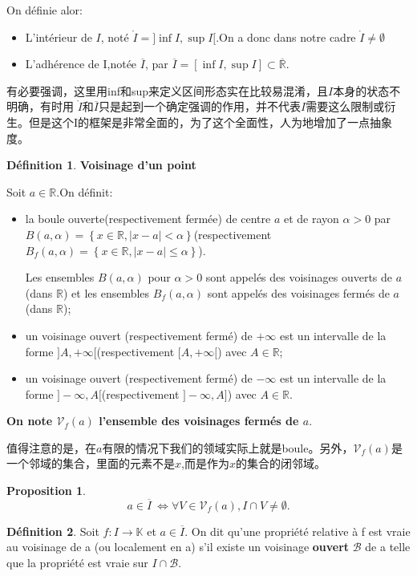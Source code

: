 \documentclass[12pt]{book}
\theoremstyle{definition}\newtheorem{dfn}{Définition}[chapter]
\theoremstyle{plain}\newtheorem{thm}{Théorème}[chapter]
\theoremstyle{plain}\newtheorem{prp}{Proposition}[chapter]
\theoremstyle{plain}\newtheorem{lem}{\bf Lemme}[chapter]
\theoremstyle{plain}\newtheorem{axm}{\bf Axiome}[chapter]
\theoremstyle{plain}\newtheorem{lmm}{\bf Lemme}[chapter]
\theoremstyle{plain}\newtheorem{cor}{\bf Corollaire}[chapter]
\theoremstyle{remark}\newtheorem{rem}{Remarque}[chapter]
\begin{document}
On définie alor:
\begin{itemize}
\item L'intérieur de $I$, noté $\mathring{I}=]\inf I,\sup I[$.On a donc dans notre cadre $\mathring{I}\not = \emptyset$
\item L'adhérence de I,notée $\overline{I}$, par $\overline{I}=[\inf I,\sup I]\subset \overline{\mathbb{R}}.$
\end{itemize}
有必要强调，这里用inf和sup来定义区间形态实在比较易混淆，且$I$本身的状态不明确，有时用 $\mathring{I}$和$\overline{I}$只是起到一个确定强调的作用，并不代表$I$需要这么限制或衍生。但是这个I的框架是非常全面的，为了这个全面性，人为地增加了一点抽象度。
\begin{dfn}{\textbf{Voisinage d'un point}}

Soit $a\in \mathbb{R}$.On définit:
\begin{itemize}
        \item  la boule ouverte(respectivement fermée) de centre $a$ et de rayon $\alpha >0$ par $
        B(a,\alpha)=\left\{x\in \mathbb{R},|x-a|< \alpha\right\}$(respectivement $
        B_f(a,\alpha)=\left\{x\in \mathbb{R},|x-a|\le \alpha\right\}$).

        Les ensembles  $
        B(a,\alpha)$ pour $\alpha>0$ sont appelés des voisinages ouverts de $a$ (dans $\mathbb{R}$) et les ensembles $	B_f(a,\alpha)$ sont appelés des voisinages fermés de $a$ (dans $\mathbb{R}$);
        \item un voisinage ouvert (respectivement fermé)
        de $+\infty$ est un intervalle de la forme $]A,+\infty[$(respectivement $[A,+\infty[$) avec $A\in \mathbb{R}$;
                \item un voisinage ouvert (respectivement fermé)
        de $-\infty$ est un intervalle de la forme $]-\infty,A[$(respectivement $]-\infty,A]$) avec $A\in \mathbb{R}$.

\end{itemize}
\textbf{On note $\mathcal{V}_f(a)$ l'ensemble des voisinages fermés de $a$}.
\end{dfn}
值得注意的是，在$a$有限的情况下我们的领域实际上就是boule。另外，$\mathcal{V}_f(a)$是一个邻域的集合，里面的元素不是$x$,而是作为$x$的集合的闭邻域。
\begin{prp}
        $$
        a\in \overline{I}\ \Leftrightarrow \forall V\in \mathcal{V}_f(a),I\cap V\not =\emptyset.
        $$
\end{prp}
\begin{dfn}
Soit $f : I\rightarrow \mathbb{K}$ et $a \in \overline{I}$. On dit qu'une propriété relative à f est vraie au voisinage de a (ou localement en a) s'il existe un voisinage \textbf{ouvert} $\mathcal{B}$ de a telle que la propriété est vraie sur $I \cap \mathcal{B}$.
\end{dfn}
\end{document}
